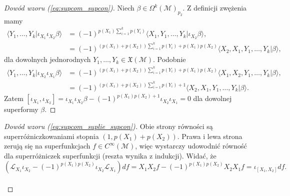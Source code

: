 \documentclass[11pt,a4paper]{report}
\theoremstyle{definition}
\begin{document}
\begin{proof}[Dowód wzoru (\ref{eq:supcom_supcon})]
	Niech $\beta\in \Omega^k (\mathcal{M})_{p_2}$. Z definicji zwężenia mamy
	\begin{equation*}
		\begin{aligned}
			\langle Y_1,\ldots,Y_k|\iota_{X_1}\iota_{X_2}\beta\rangle & =(-1)^{p(X_1)\sum_{i=1}^k p(Y_i)}\langle X_1,Y_1,\ldots,Y_k|\iota_{X_2}\beta\rangle,               \\
			                                                          & =(-1)^{(p(X_1)+p(X_2))\sum_{i=1}^kp(Y_i)+p(X_1)p(X_2)}\langle X_2,X_1,Y_1,\ldots,Y_k|\beta\rangle, 
		\end{aligned}
	\end{equation*}
	dla dowolnych jednorodnych $Y_1, \ldots, Y_k \in \mathfrak{X}(\mathcal{M})$. Podobnie
	\begin{equation*}
		\begin{aligned}
			\langle Y_1,\ldots,Y_k | \iota_{X_2}\iota_{X_1}\beta\rangle & = (-1)^{(p(X_1)+p(X_2)) \sum_{i=1}^k p(Y_i)+p(X_1)p(X_2)}\langle X_1,X_2,Y_1,\ldots,Y_k | \beta\rangle, \\
			                                                            & =(-1)^{(p(X_1)+p(X_2)) \sum_{i=1}^k p(Y_i)+1}\langle X_2,X_1,Y_1,\ldots,Y_k | \beta\rangle.             
		\end{aligned}
	\end{equation*}
	Zatem $ [\iota_{X_1},\iota_{X_2}]= \iota_{X_1}\iota_{X_2}\beta - (-1)^{p(X_1)p(X_2)+1}\iota_{X_2}\iota_{X_1}=0$ dla dowolnej superformy $\beta$. 
\end{proof}
			      				
\begin{proof}[Dowód wzoru (\ref{eq:supcom_suplie_supcon})]
	Obie strony równości są superróżniczkowaniami stopnia $(1,p(X_1) + p(X_2))$. Prawa i lewa strona zerują się na superfunkcjach $f \in C^\infty(\mathcal M)$, więc wystarczy udowodnić równość dla superróżniczek superfunkcji (reszta wynika z indukcji). Widać, że
	\begin{equation*}
		(\mathcal{L}_{X_1}\iota_{X_2}-(-1)^{p(X_1)p(X_2)}\iota_{X_2}\mathcal{L}_{X_1})df=X_1X_2f-(-1)^{p(X_1)p(X_2)}X_2X_1f=\iota_{[X_1,X_2]}df.
	\end{equation*}\\[-37pt]
\end{proof}
			      				
\end{document}
